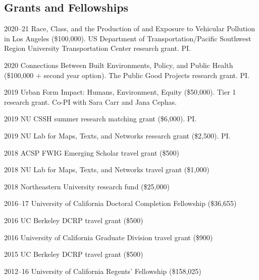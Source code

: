 \documentclass[12pt,letterpaper]{report}
\begin{document}
    \subsection*{Grants and Fellowships}

    \begin{tablist}

        \item[2020--21] \tab Race, Class, and the Production of and Exposure to Vehicular Pollution in Los Angeles (\$100,000). US Department of Transportation/Pacific Southwest Region University Transportation Center research grant. PI.

        \item[2020] \tab Connections Between Built Environments, Policy, and Public Health (\$100,000 + second year option). The Public Good Projects research grant. PI.

        \item[2019] \tab Urban Form Impact: Humans, Environment, Equity (\$50,000). Tier 1 research grant. Co-PI with Sara Carr and Jana Cephas.

        \item[2019] \tab NU CSSH summer research matching grant (\$6,000). PI.

        \item[2019] \tab NU Lab for Maps, Texts, and Networks research grant (\$2,500). PI.

        \item[2018] \tab ACSP FWIG Emerging Scholar travel grant (\$500)

        \item[2018] \tab NU Lab for Maps, Texts, and Networks travel grant (\$1,000)

        \item[2018] \tab Northeastern University research fund (\$25,000)

        \item[2016--17] \tab University of California Doctoral Completion Fellowship (\$36,655)

        \item[2016] \tab UC Berkeley DCRP travel grant (\$500)

        \item[2016] \tab University of California Graduate Division travel grant (\$900)

        \item[2015] \tab UC Berkeley DCRP travel grant (\$500)

        \item[2012--16] \tab University of California Regents' Fellowship (\$158,025)

    \end{tablist}
\end{document}
